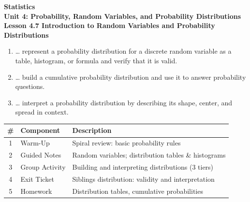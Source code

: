 \documentclass[10pt]{article}
\begin{document}
\vspace{-0.8in}

\begin{center}
  {\color{white}\textbf{\LARGE Statistics}}\\[4pt]
  {\color{skymid}\large\textbf{Unit 4: Probability, Random Variables, and Probability Distributions}}\\[6pt]
  {\color{white}\textbf{\large Lesson 4.7 \quad Introduction to Random Variables and Probability Distributions}}
\end{center}

\vspace{0.22in}
\namedateperiod
\vspace{0.18in}

\begin{learningtargetbox}
\small
\begin{enumerate}[leftmargin=1.5em, itemsep=5pt]
  \item \ldots{} represent a probability distribution for a discrete random variable as a
        table, histogram, or formula and verify that it is valid.
  \item \ldots{} build a cumulative probability distribution and use it to answer
        probability questions.
  \item \ldots{} interpret a probability distribution by describing its shape, center,
        and spread in context.
\end{enumerate}
\end{learningtargetbox}

\vspace{0.14in}

\begin{tocbox}
\small
\renewcommand{\arraystretch}{1.5}
\begin{tabularx}{\linewidth}{@{} c l X @{}}
\rowcolor{sky}
\textbf{\#} & \textbf{Component} & \textbf{Description} \\
\midrule
1 & Warm-Up        & Spiral review: basic probability rules \\
2 & Guided Notes   & Random variables; distribution tables \& histograms \\
3 & Group Activity & Building and interpreting distributions (3 tiers) \\
4 & Exit Ticket    & Siblings distribution: validity and interpretation \\
5 & Homework       & Distribution tables, cumulative probabilities \\
\end{tabularx}
\end{tocbox}
\end{document}
